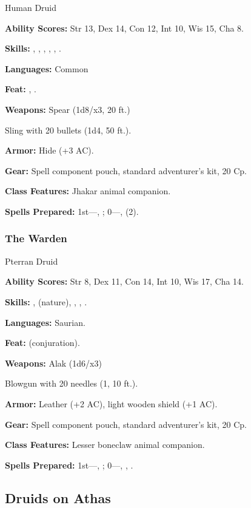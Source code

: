 Human Druid

\textbf{Ability Scores:} Str 13, Dex 14, Con 12, Int 10, Wis 15, Cha 8.

\textbf{Skills:} , , , , , .

\textbf{Languages:} Common

\textbf{Feat:} , .

\textbf{Weapons:} Spear (1d8/x3, 20 ft.)

Sling with 20 bullets (1d4, 50 ft.).

\textbf{Armor:} Hide (+3 AC).

\textbf{Gear:} Spell component pouch, standard adventurer's kit, 20 Cp.

\textbf{Class Features:} Jhakar animal companion.

\textbf{Spells Prepared:} 1st---, ;\hskip10pt 0---,  (2).

\subsubsection{The Warden}

Pterran Druid

\textbf{Ability Scores:} Str 8, Dex 11, Con 14, Int 10, Wis 17, Cha 14.

\textbf{Skills:} ,  (nature), , , .

\textbf{Languages:} Saurian.

\textbf{Feat:}  (conjuration).

\textbf{Weapons:} Alak (1d6/x3)

Blowgun with 20 needles (1, 10 ft.).

\textbf{Armor:} Leather (+2 AC), light wooden shield (+1 AC).

\textbf{Gear:} Spell component pouch, standard adventurer's kit, 20 Cp.

\textbf{Class Features:} Lesser boneclaw animal companion.

\textbf{Spells Prepared:} 1st---, ; 0---, , .

\subsection{Druids on Athas}

